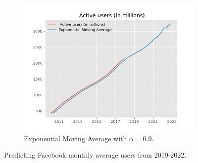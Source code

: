 \begin{figure}[t]
\begin{subfigure}[t]{0.30\linewidth}
\includegraphics[width=\linewidth ]{fig/fb_ema.png}
\caption{{\footnotesize Exponential Moving Average with $\alpha = 0.9$.}}\vspace{-2mm}
\label{fig:pla2}
\end{subfigure}
\caption{Predicting Facebook monthly average users from 2019-2022.}\vspace{-2mm}
\label{fig:fb_users}
\end{figure}

